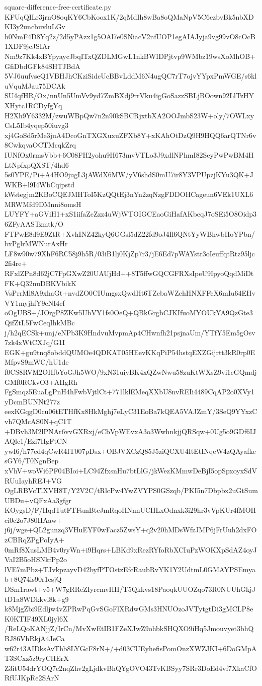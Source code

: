 \documentclass[11pt]{article}
\theoremstyle{definition}
\theoremstyle{remark}
\begin{document}
\begin{filecontents*}[overwrite]{square-difference-free-certificate.py}
KFUqQILr3jrnO8oqKY6CbKoox1K/2qMdIh8wBa8oQMaNpV5C6ezbvBk5nbXDKI3y2uncbuvluLGv
h0NmF4D8Yq2z/2d5yPAzx1g5OAl7e0SNiacV2nfUOP1egAIAJyja9vg99vO8cOcB1XDF9jcJSIAr
Nm9z7Kk4xBYpyaycJbqITxQZDLMGwL1nkBWIDPjtvp9WMbz19wsXoMhOB+GfiDbdGFk84SHTJBdA
5VJ6uufvseQ1VBHJhCKziSidcUcBBvLddM6N4ugQC7rT7ojvYYpxPmWGE/s6kluVquMJau75DCAk
SU4qfHR/Ox/nnUn5UmVv9yd7ZmBXdj9rrVku4igGoSazzSBLjBOown92LlTzHYXHytc1RCDyfgYq
H2Xh9Y6332M/zwuWBpQw7n2n90kSBCRjxtbXA2OOJmbS23W+oly/7OWLxyCsL5Ib4yqep50iuvg3
xj4GoSd5rMe3juA4DcoGnTXGXuxuZFXb8Y+xKAhOtDzQ9H9HQQ6arQTNr6v8CwkqvaOCTMcqkZrq
IUNfOx0rmsVbb+6C08FH2yohu9H673mvVTLo3J9xdlNPhmI82SeyPwPwBM4HLtNpfxpQXST/4hd6
5s0YPE/Pi+A4HO9jugL3jAWdX6MW/yV6shdS0mU7ir8Y3VPUpzjKYu3QK+JWKB+l9I4WbCqipstd
kWstegjm2KBoCQEJMHToI5KzQQtEj3nYn2zqNzgFDDOHCageun6VEk1UXL6MRWMfd9DMnni8omsH
LUYFY+aGViH1+xS1iifaZcZzz4uWjWTOIGCEaoGiHafAKbeqJ7oSEi5O8Oidp36ZFyAASTzmtk/O
FTPwE8d9E9ZtR+XvhINZ42kyQ6GGsl5dZ22fd9oJ4Il6QNtYyWBhwbHoYPbn/bxPglrMWNurAxHr
LF8w90w79XhF6RC58j9h5R/03iB1lj0KjZp7r3/jE6Ed7pWAYstr3oIeuffqtRtz95ljc2fi4re+
RFxlZPn8d62jC7FpGXwZ20UAUjHd++8T5ffwGQCGFRXsIpeU9IpyoQqdMiDtFK+Q32nuDBKVbikK
VsPrrMl8A9xhaGt+nvdZO0CIUmgsxQwdHt6TZcbaWZehHNXFFcX6mIu64EHvVY1myjhfY9eNI4cf
oOgUBS+/JOrgP8ZKw5UbVY1fs0OeQ+QBkGrgbCJKIfuoMYOUkYA9QzGte3QifZtL5FwCeqIhkMBc
j/h2qECSk+unj/eNPb3K9HndvuMvpmAp4CHwnfh21psjnaUm/YTfY5Em5gOsv7zk4xWtCXJq/G1I
EGK+gu9tnq8obddQUMOe4QDKAT05HEevKKqPiP54hstqEXZGijrtt3kR0rp0EMfpvS9mWC/hU1de
f0CS8RVM2OHfbYoGJh5WO/9xN31uiyBK4xQZwNwu58zuKtWXsZ9vi1cGQmdjGMf0RCkvO3+AHgRh
FgSmqz5EuaLgPnH4hFwbVjtlCt+771lklEMeqXXbU8nvREIi4489CqAP2o0XVy1yDcmBUNNt277z
eexKGqgD0cu06tETHfKx8HkMghj7eLyC31EoBa7kQEA5VAJZmY/3SeQ9YYxzCvh7QMcAS0N+qC1T
+DBvh3M2lPNAr6vvGXRxj/eCbVpWEvxA3o3WwhnkjjQRSqw+0Ug5o9GDf6IJAQlc1/Ezi7HgFtCN
ywI6/h77ed4qCwR4IT007pDsx+OBJVXCzQ85J5ziQCXU4ItEtINqeW4zQAyafkcsGY6/T0NgnBep
xVhV+woWi6PF04BIoi+LC94ZfxsnHu7btLlG/jkWezKMmwDeBjI5opSpxoyxSdVRUuIayhREJ+VG
OgLRBVcTlXVH8T/Y2V2C/tRlcPw4YwZVYPS0GSzqb/PKI5n7Dbpbx2uGtSumUBDu+vQFxAa3gfgr
KOygsD/F/HqdTutFTFsmBtcJmRqoHNnnUCHLxOdnxk3i29hr3vVpKUr4fMOHci0c2o7J80IIAaw+
j6j/wge+QL2gunzq3VHuEYF0wFacz5ZwsY+q2v20hMDsWfzJMP6jFrUuh2dxFOzCBRqZPgPoIyA+
0mRf8XusLMB4v0ryWn+i9Hqrs+LBKd9xRezRYfoRbXCIuPzWOKXpSdAZ4oyJVaI2B5oHSNkfPp2o
lVE7mPbz+TJvkpzayvD42byfPTOstzEfcRaubRvYK1Y2UdtmL0GMAYPSEmyab+8Q74is90r1esjQ
DSm1rawt+v5+W7gRReZIyrcmvHH/T5Qkkvs18PaoqkUUOZqo73R0NUUhGkjJtD1a8WDkkvl8k+g9
k8MjgZbi9Edljw4vZPRwPqGvSGoFlXRdwGMs3HNUOzoJVTytgtDi3gMCLP8eK0KTIF49XL0jyl6X
/ReLQoKANjjZ/IrCn/MvXwEtIB1FZeXJwZ9ohbkSHQXO9iHq5Jmouvyet3bhQBJ86VhRkjA4JeCa
w62r43AIDksAvThb8LYGcF8rN+/+d03CUEyhefisPomOnzXWZJKI+6DoGMpAT3SCxz5z9ryCHErX
Z3itU54drYOQ7c2nqZhv2gLjdkvBhQYgOVO43TvKBSyy7SRr3DoEd4vf7XkaCfORfUJKpRe2SArN

\end{filecontents*}
\end{document}
